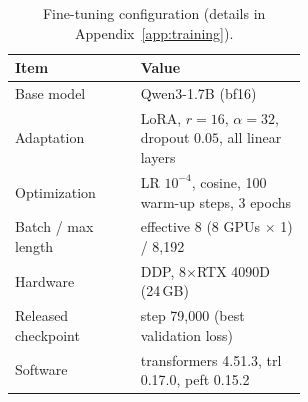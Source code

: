 \begin{table}[t]
\centering
\small
\setlength{\tabcolsep}{3pt}
\begin{tabular}{@{}l>{\raggedright\arraybackslash}p{0.58\linewidth}@{}}
\toprule
Item & Value \\
\midrule
Base model & Qwen3-1.7B (bf16) \\
Adaptation & LoRA, $r=16$, $\alpha=32$, dropout $0.05$, all linear layers \\
Optimization & LR $10^{-4}$, cosine, 100 warm-up steps, 3 epochs \\
Batch / max length & effective 8 (8 GPUs $\times$ 1) / 8,192 \\
Hardware & DDP, 8$\times$RTX 4090D (24\,GB) \\
Released checkpoint & step 79,000 (best validation loss) \\
Software & transformers 4.51.3, trl 0.17.0, peft 0.15.2 \\
\bottomrule
\end{tabular}
\caption{Fine-tuning configuration (details in Appendix~\ref{app:training}).}
\label{tab:finetune-config}
\end{table}
